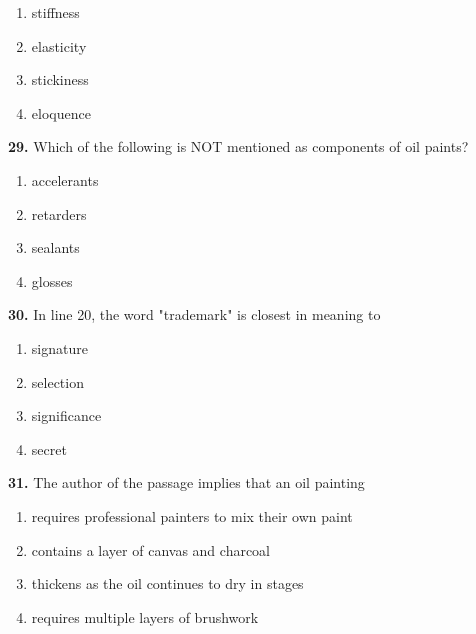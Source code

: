 \documentclass[12pt]{article}
\begin{document}
\begin{enumerate}[label=(\Alph*),leftmargin=*,itemsep=0.2em]
\item stiffness
\item elasticity
\item stickiness
\item eloquence
\end{enumerate}
\par
\vspace{0.25\baselineskip}
\noindent\textbf{29.} Which of the following is NOT mentioned as components of oil paints?
\begin{enumerate}[label=(\Alph*),leftmargin=*,itemsep=0.2em]
\item accelerants
\item retarders
\item sealants
\item glosses
\end{enumerate}
\par
\vspace{0.25\baselineskip}
\noindent\textbf{30.} In line 20, the word "trademark" is closest in meaning to
\begin{enumerate}[label=(\Alph*),leftmargin=*,itemsep=0.2em]
\item signature
\item selection
\item significance
\item secret
\end{enumerate}
\par
\vspace{0.25\baselineskip}
\noindent\textbf{31.} The author of the passage implies that an oil painting
\begin{enumerate}[label=(\Alph*),leftmargin=*,itemsep=0.2em]
\item requires professional painters to mix their own paint
\item contains a layer of canvas and charcoal
\item thickens as the oil continues to dry in stages
\item requires multiple layers of brushwork
\end{enumerate}
\par
\vspace{0.25\baselineskip}
\end{document}
